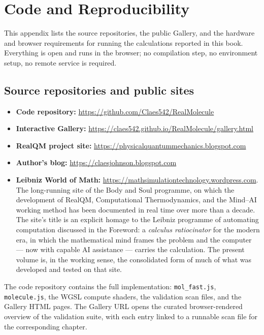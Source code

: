 \chapter{Code and Reproducibility}\label{app:code}

This appendix lists the source repositories, the public Gallery, and the hardware and browser requirements for running the calculations reported in this book. Everything is open and runs in the browser; no compilation step, no environment setup, no remote service is required.

\section{Source repositories and public sites}\label{sec:repos}

\begin{itemize}
\item \textbf{Code repository:} \url{https://github.com/Claes542/RealMolecule}
\item \textbf{Interactive Gallery:} \url{https://claes542.github.io/RealMolecule/gallery.html}
\item \textbf{RealQM project site:} \url{https://physicalquantummechanics.blogspot.com}
\item \textbf{Author's blog:} \url{https://claesjohnson.blogspot.com}
\item \textbf{Leibniz World of Math:} \url{https://mathsimulationtechnology.wordpress.com}.\\
The long-running site of the Body and Soul programme, on which the development of RealQM, Computational Thermodynamics, and the Mind--AI working method has been documented in real time over more than a decade. The site's title is an explicit homage to the Leibniz programme of automating computation discussed in the Foreword: a \emph{calculus ratiocinator} for the modern era, in which the mathematical mind frames the problem and the computer --- now with capable AI assistance --- carries the calculation. The present volume is, in the working sense, the consolidated form of much of what was developed and tested on that site.
\end{itemize}

The code repository contains the full implementation: \texttt{mol\_fast.js}, \texttt{molecule.js}, the WGSL compute shaders, the validation scan files, and the Gallery HTML pages. The Gallery URL opens the curated browser-rendered overview of the validation suite, with each entry linked to a runnable scan file for the corresponding chapter.

